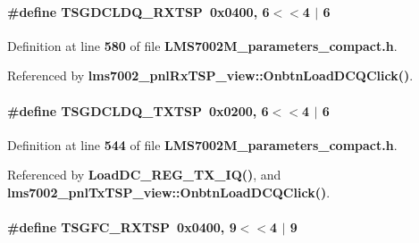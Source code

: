 \paragraph[{T\+S\+G\+D\+C\+L\+D\+Q\+\_\+\+R\+X\+T\+SP}]{\setlength{\rightskip}{0pt plus 5cm}\#define T\+S\+G\+D\+C\+L\+D\+Q\+\_\+\+R\+X\+T\+SP~0x0400, 6$<$$<$4 $\vert$  6}\label{LMS7002M__parameters__compact_8h_ad3bf89b17413b280d15c83a846145787}


Definition at line {\bf 580} of file {\bf L\+M\+S7002\+M\+\_\+parameters\+\_\+compact.\+h}.



Referenced by {\bf lms7002\+\_\+pnl\+Rx\+T\+S\+P\+\_\+view\+::\+Onbtn\+Load\+D\+C\+Q\+Click()}.

\paragraph[{T\+S\+G\+D\+C\+L\+D\+Q\+\_\+\+T\+X\+T\+SP}]{\setlength{\rightskip}{0pt plus 5cm}\#define T\+S\+G\+D\+C\+L\+D\+Q\+\_\+\+T\+X\+T\+SP~0x0200, 6$<$$<$4 $\vert$  6}\label{LMS7002M__parameters__compact_8h_a5e1c9b0c2637f079dfe5899380cfb024}


Definition at line {\bf 544} of file {\bf L\+M\+S7002\+M\+\_\+parameters\+\_\+compact.\+h}.



Referenced by {\bf Load\+D\+C\+\_\+\+R\+E\+G\+\_\+\+T\+X\+\_\+\+I\+Q()}, and {\bf lms7002\+\_\+pnl\+Tx\+T\+S\+P\+\_\+view\+::\+Onbtn\+Load\+D\+C\+Q\+Click()}.

\paragraph[{T\+S\+G\+F\+C\+\_\+\+R\+X\+T\+SP}]{\setlength{\rightskip}{0pt plus 5cm}\#define T\+S\+G\+F\+C\+\_\+\+R\+X\+T\+SP~0x0400, 9$<$$<$4 $\vert$  9}\label{LMS7002M__parameters__compact_8h_a396699b191e7fe9dc527e5ec1467b57d}


